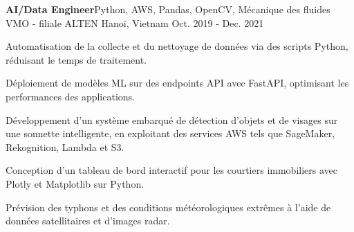 \begin{cventries}

  \cventry
    {\textbf{AI/Data Engineer}{\enskip\cdotp\enskip}Python, AWS, Pandas, OpenCV, Mécanique des fluides} %
    {VMO - filiale ALTEN} %
    {Hanoï, Vietnam} %
    {Oct. 2019 - Dec. 2021} %
    {
      \begin{cvitems} %
        \item {Automatisation de la collecte et du nettoyage de données via des scripts Python, réduisant le temps de traitement.}
        \item {Déploiement de modèles ML sur des endpoints API avec FastAPI, optimisant les performances des applications.}
        \item {Développement d’un système embarqué de détection d’objets et de visages sur une sonnette intelligente, en exploitant des services AWS tels que SageMaker, Rekognition, Lambda et S3.}
        \item {Conception d'un tableau de bord interactif pour les courtiers immobiliers avec Plotly et Matplotlib sur Python.}
        \item {Prévision des typhons et des conditions météorologiques extrêmes à l’aide de données satellitaires et d’images radar.}
      \end{cvitems}
    }


\end{cventries}
